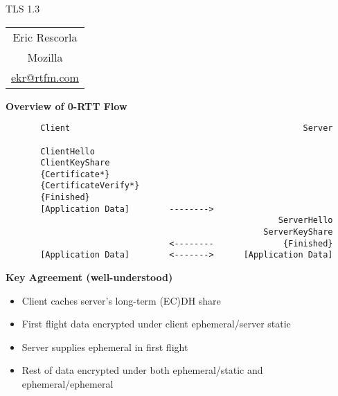 \documentclass[helvetica]{seminar}
\newcommand{\heading}[1]{%
  \begin{center} 
    \large\bf 
    #1 
  \end{center} 
  \vspace{.4 in}}
\begin{document}
\begin{slide}
\begin{center}
\vspace{.5 in}
\LARGE{{\bf}TLS 1.3}\\
\vspace{.2in}
\large{
\begin{tabular}{c}
Eric Rescorla\\
Mozilla\\
\url{ekr@rtfm.com}
\end{tabular}
}
\end{center}

\end{slide}

\centerslidesfalse 


\begin{slide}
\heading{Overview of 0-RTT Flow}

{\scriptsize
\begin{verbatim}
       Client                                               Server

       ClientHello
       ClientKeyShare
       {Certificate*}
       {CertificateVerify*}
       {Finished}              
       [Application Data]        -------->
                                                       ServerHello
                                                    ServerKeyShare
                                 <--------              {Finished}
       [Application Data]        <------->      [Application Data]
\end{verbatim}
}
\end{slide}


\begin{slide}
\heading{Key Agreement (well-understood)}

\begin{itemize}
\item Client caches server's long-term (EC)DH share
\item First flight data encrypted under client ephemeral/server static
\item Server supplies ephemeral in first flight
\item Rest of data encrypted under both ephemeral/static and ephemeral/ephemeral
\end{itemize}
\end{slide}
\end{document}
